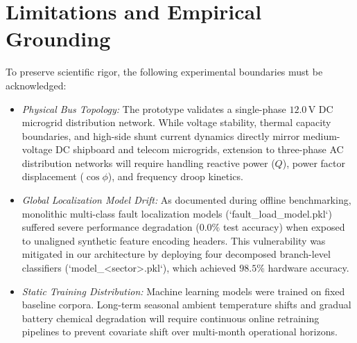 \documentclass[journal,10pt,twocolumn]{IEEEtran}
\begin{document}
\section{Limitations and Empirical Grounding}
To preserve scientific rigor, the following experimental boundaries must be acknowledged:
\begin{itemize}
    \item \textit{Physical Bus Topology:} The prototype validates a single-phase $12.0$\,V DC microgrid distribution network. While voltage stability, thermal capacity boundaries, and high-side shunt current dynamics directly mirror medium-voltage DC shipboard and telecom microgrids, extension to three-phase AC distribution networks will require handling reactive power ($Q$), power factor displacement ($\cos \phi$), and frequency droop kinetics.
    \item \textit{Global Localization Model Drift:} As documented during offline benchmarking, monolithic multi-class fault localization models (`fault_load_model.pkl`) suffered severe performance degradation ($0.0\%$ test accuracy) when exposed to unaligned synthetic feature encoding headers. This vulnerability was mitigated in our architecture by deploying four decomposed branch-level classifiers (`model_<sector>.pkl`), which achieved $98.5\%$ hardware accuracy.
    \item \textit{Static Training Distribution:} Machine learning models were trained on fixed baseline corpora. Long-term seasonal ambient temperature shifts and gradual battery chemical degradation will require continuous online retraining pipelines to prevent covariate shift over multi-month operational horizons.
\end{itemize}

\end{document}

